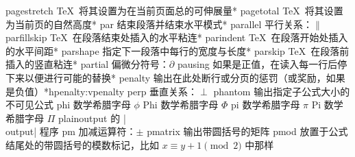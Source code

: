 \capcs pagestretch {\TeX\ 将其设置为在当前页面总的可伸展量}*{}
\capcs pagetotal {\TeX\ 将其设置为当前页的自然高度}*{}
\capcs par {结束段落并结束水平模式}*{\@par}
\capcs parallel {平行关系：$\parallel$}{}{}
\capcs parfillskip {\TeX\ 在段落结束处插入的水平粘连}*{}
\capcs parindent {\TeX\ 在段落开始处插入的水平间距}*{}
\capcs parshape {指定下一段落中每行的宽度与长度}*{}
\capcs parskip {\TeX\ 在段落前插入的竖直粘连}*{}
\capcs partial {偏微分符号：$\partial$}{}{}
\capcs pausing {如果是正值，在读入每一行后停下来以便进行可能的替换}*{}
\capcstwo penalty {输出在此处断行或分页的惩罚（或奖励，如果是负值）}*{hpenalty:vpenalty}
\capcs perp {垂直关系：$\perp$}{}{}
\capcs phantom {输出指定子公式大小的不可见公式}{}{}
\capcs phi {数学希腊字母 $\phi$}{}{}
\capcs Phi {数学希腊字母 $\Phi$}{}{}
\capcs pi {数学希腊字母 $\pi$}{}{}
\capcs Pi {数学希腊字母 $\Pi$}{}{}
\capcs plainoutput {\plainTeX 的 |\\output| 程序}{}{}
\capcs pm {加减运算符：$\pm$}{}{}
\capcs pmatrix {输出带圆括号的矩阵}{}{}
\capcs pmod {放置于公式结尾处的带圆括号的模数标记，比如 $x \equiv y+1 \pmod 2$ 中那样}{}{}
